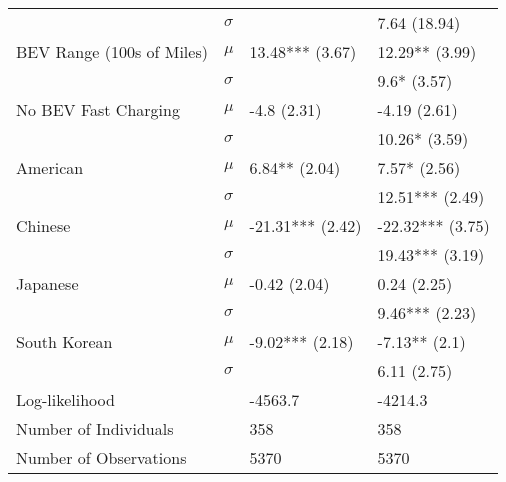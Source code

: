 \begin{tabular}{llll}
                          &  $\sigma$ &                               &                  7.64 (18.94) \\
BEV Range (100s of Miles) &     $\mu$ &               13.48*** (3.67) &                12.29** (3.99) \\
                          &  $\sigma$ &                               &                   9.6* (3.57) \\
     No BEV Fast Charging &     $\mu$ &                   -4.8 (2.31) &                  -4.19 (2.61) \\
                          &  $\sigma$ &                               &                 10.26* (3.59) \\
                 American &     $\mu$ &                 6.84** (2.04) &                  7.57* (2.56) \\
                          &  $\sigma$ &                               &               12.51*** (2.49) \\
                  Chinese &     $\mu$ &              -21.31*** (2.42) &              -22.32*** (3.75) \\
                          &  $\sigma$ &                               &               19.43*** (3.19) \\
                 Japanese &     $\mu$ &                  -0.42 (2.04) &                   0.24 (2.25) \\
                          &  $\sigma$ &                               &                9.46*** (2.23) \\
             South Korean &     $\mu$ &               -9.02*** (2.18) &                 -7.13** (2.1) \\
                          &  $\sigma$ &                               &                   6.11 (2.75) \\
    \hline Log-likelihood &           &                       -4563.7 &                       -4214.3 \\
    Number of Individuals &           &                           358 &                           358 \\
   Number of Observations &           &                          5370 &                          5370 \\
\bottomrule
\end{tabular}
